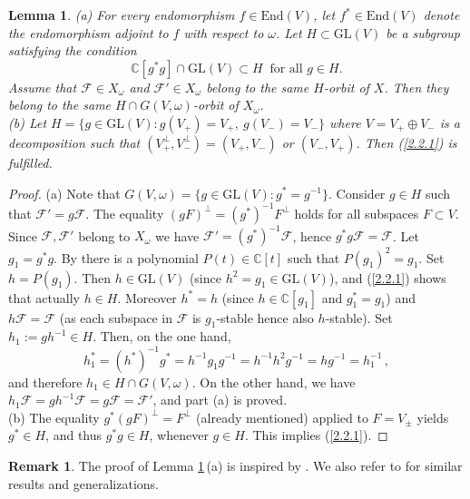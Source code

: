 \documentclass{amsart}
\newtheorem{lemma}{Lemma}
\theoremstyle{definition}
\newtheorem{remark}{Remark}
\begin{document}
\begin{lemma}
\label{lemma-2.2.1}
{\rm (a)}
For every endomorphism $f\in\mathrm{End}(V)$, let $f^*\in\mathrm{End}(V)$ denote the endomorphism adjoint to $f$ with respect to $\omega$.
Let $H\subset \mathrm{GL}(V)$ be a subgroup satisfying the condition
\begin{equation}
\label{2.2.1}
\mathbb{C}[g^*g]\cap\mathrm{GL}(V)\subset H\ \mbox{ for all $g\in H$}.
\end{equation}
Assume that $\mathcal{F}\in X_\omega$ and $\mathcal{F}'\in X_\omega$ belong to the same $H$-orbit of $X$.  Then they belong to the same $H\cap G(V,\omega)$-orbit of $X_\omega$. \\
{\rm (b)} Let $H=\{g\in \mathrm{GL}(V):g(V_+)=V_+,\ g(V_-)=V_-\}$ where $V=V_+\oplus V_-$ is a decomposition such that
$(V_+^\perp,V_-^\perp)=(V_+,V_-)$ or $(V_-,V_+)$.
Then (\ref{2.2.1}) is fulfilled.
\end{lemma}

\begin{proof}
{\rm (a)}
Note that $G(V,\omega)=\{g\in\mathrm{GL}(V):g^*=g^{-1}\}$.
Consider $g\in H$ such that $\mathcal{F}'=g\mathcal{F}$.
The equality $(gF)^\perp=(g^*)^{-1}F^\perp$ holds for all subspaces $F\subset V$.
Since $\mathcal{F},\mathcal{F}'$ belong to $X_\omega$ we have $\mathcal{F}'=(g^*)^{-1}\mathcal{F}$,
hence $g^*g\mathcal{F}=\mathcal{F}$.
Let $g_1=g^*g$.
By \cite[Lemma 1.5]{Jantzen} there is a polynomial $P(t)\in\mathbb{C}[t]$ such that 
$P(g_1)^2=g_1$. Set $h=P(g_1)$.
Then $h\in\mathrm{GL}(V)$ (since $h^2=g_1\in\mathrm{GL}(V)$), and (\ref{2.2.1}) shows that actually $h\in H$.
Moreover $h^*=h$ (since $h\in\mathbb{C}[g_1]$ and $g_1^*=g_1$)
and $h\mathcal{F}=\mathcal{F}$ (as each subspace in $\mathcal{F}$ is $g_1$-stable hence also $h$-stable).
Set $h_1:=gh^{-1}\in H$.
Then, on the one hand,
\[h_1^*=(h^*)^{-1}g^*=h^{-1}g_1g^{-1}=h^{-1}h^2g^{-1}=hg^{-1}=h_1^{-1}\,,\]
and therefore $h_1\in H\cap G(V,\omega)$.  
On the other hand, we have
$h_1\mathcal{F}=gh^{-1}\mathcal{F}=g\mathcal{F}=\mathcal{F}'$, and part (a) is proved. \\
{\rm (b)}
The equality $g^*(gF)^\perp=F^\perp$ (already mentioned) applied to $F=V_\pm$ yields $g^*\in H$, and thus $g^*g\in H$, whenever $g\in H$. This implies (\ref{2.2.1}).
\end{proof}

\begin{remark}
The proof of Lemma \ref{lemma-2.2.1}\,{\rm (a)} is inspired by \cite[\S1.4]{Jantzen}. We also refer to \cite{Nishiyama, Otha} for similar results and generalizations.
\end{remark}
\end{document}
